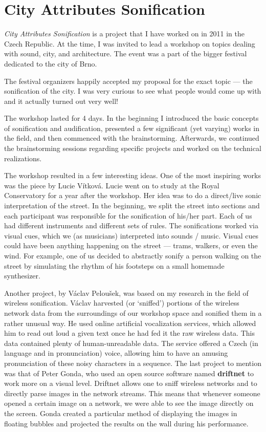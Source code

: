 \documentclass[12pt,a4paper,oneside]{report}
\begin{document}

\clearpage
\section{City Attributes Sonification}

\emph{City Attributes Sonification} is a project that I have worked on in 2011 in the Czech Republic. At the time, I was invited to lead a workshop on topics dealing with sound, city, and architecture. The event was a part of the bigger festival dedicated to the city of Brno.

The festival organizers happily accepted my proposal for the exact topic --- the sonification of the city. I was very curious to see what people would come up with and it actually turned out very well!

The workshop lasted for 4 days. In the beginning I introduced the basic concepts of sonification and audification, presented a few significant (yet varying) works in the field, and then commenced with the brainstorming. Afterwards, we continued the brainstorming sessions regarding specific projects and worked on the technical realizations.

The workshop resulted in a few interesting ideas. One of the most inspiring works was the piece by Lucie Vítková. Lucie went on to study at the Royal Conservatory for a year after the workshop. Her idea was to do a direct/live sonic interpretation of the street. In the beginning, we split the street into sections and each participant was responsible for the sonification of his/her part. Each of us had different instruments and different sets of rules. The sonifications worked via visual cues, which we (as musicians) interpreted into sounds / music. Visual cues could have been anything happening on the street --- trams, walkers, or even the wind. For example, one of us decided to abstractly sonify a person walking on the street by simulating the rhythm of his footsteps on a small homemade synthesizer.

Another project, by Václav Peloušek, was based on my research in the field of wireless sonification. Václav harvested (or `sniffed') portions of the wireless network data from the surroundings of our workshop space and sonified them in a rather unusual way. He used online artificial vocalization services, which allowed him to read out loud a given text once he had fed it the raw wireless data. This data contained plenty of human-unreadable data. The service offered a Czech (in language and in pronunciation) voice, allowing him to have an amusing pronunciation of these noisy characters in a sequence. The last project to mention was that of Peter Gonda, who used an open source software named \textbf{driftnet} to work more on a visual level. Driftnet allows one to sniff wireless networks and to directly parse images in the network streams. This means that whenever someone opened a certain image on a network, we were able to see the image directly on the screen. Gonda created a particular method of displaying the images in floating bubbles and projected the results on the wall during his performance.
\end{document}
